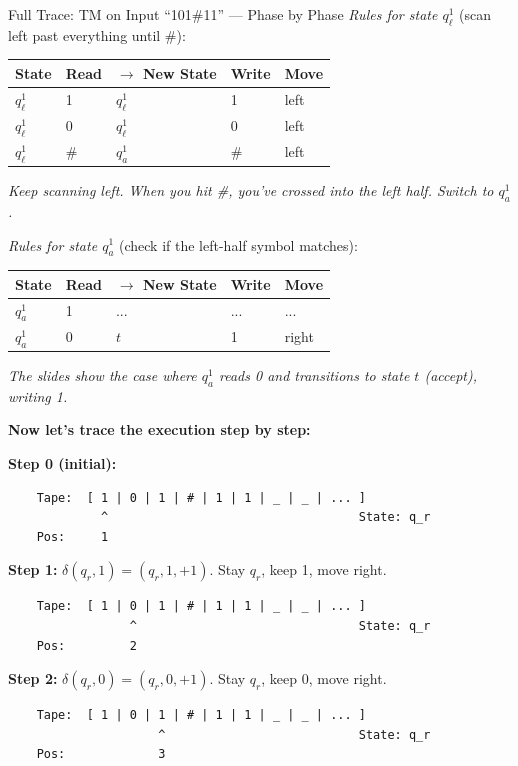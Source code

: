 \documentclass[11pt,a4paper]{article}
\begin{document}
\begin{examplebox}{Full Trace: TM on Input ``101\#11'' --- Phase by Phase}
\textit{Rules for state $q_\ell^1$} (scan left past everything until \#):
\begin{center}
\begin{tabular}{lllll}
\toprule
State & Read & $\to$ New State & Write & Move \\
\midrule
$q_\ell^1$ & 1 & $q_\ell^1$ & 1 & left \\
$q_\ell^1$ & 0 & $q_\ell^1$ & 0 & left \\
$q_\ell^1$ & \# & $q_a^1$ & \# & left \\
\bottomrule
\end{tabular}
\end{center}
\textit{Keep scanning left. When you hit \#, you've crossed into the left half. Switch to $q_a^1$.}

\textit{Rules for state $q_a^1$} (check if the left-half symbol matches):
\begin{center}
\begin{tabular}{lllll}
\toprule
State & Read & $\to$ New State & Write & Move \\
\midrule
$q_a^1$ & 1 & ... & ... & ... \\
$q_a^1$ & 0 & $t$ & 1 & right \\
\bottomrule
\end{tabular}
\end{center}
\textit{The slides show the case where $q_a^1$ reads 0 and transitions to state $t$ (accept), writing 1.}

\vspace{0.5em}
\textbf{Now let's trace the execution step by step:}

\textbf{Step 0 (initial):}
\begin{lstlisting}
    Tape:  [ 1 | 0 | 1 | # | 1 | 1 | _ | _ | ... ]
             ^                                   State: q_r
    Pos:     1
\end{lstlisting}

\textbf{Step 1:} $\delta(q_r, 1) = (q_r, 1, +1)$. Stay $q_r$, keep 1, move right.
\begin{lstlisting}
    Tape:  [ 1 | 0 | 1 | # | 1 | 1 | _ | _ | ... ]
                 ^                               State: q_r
    Pos:         2
\end{lstlisting}

\textbf{Step 2:} $\delta(q_r, 0) = (q_r, 0, +1)$. Stay $q_r$, keep 0, move right.
\begin{lstlisting}
    Tape:  [ 1 | 0 | 1 | # | 1 | 1 | _ | _ | ... ]
                     ^                           State: q_r
    Pos:             3
\end{lstlisting}


\end{examplebox}
\end{document}
